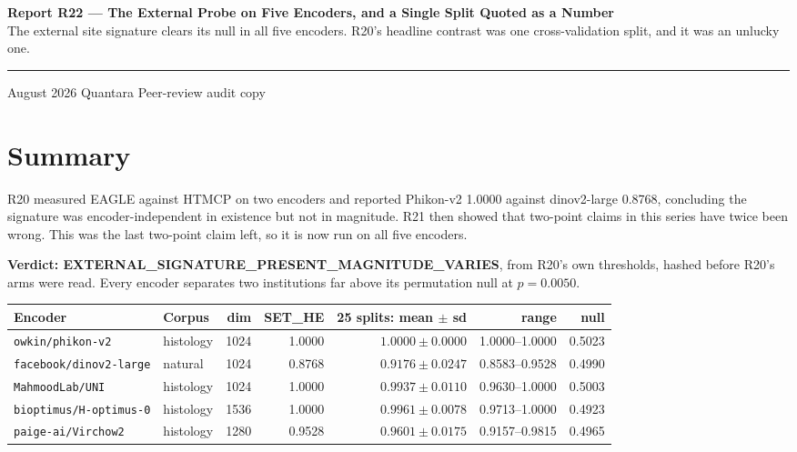 \documentclass[11pt,a4paper]{article}
\begin{document}
\thispagestyle{empty}
\noindent
{\large\bfseries\color{qnavy} Report R22 --- The External Probe on Five Encoders, and a Single
Split Quoted as a Number}\\[2pt]
{\color{qgrey}The external site signature clears its null in all five encoders. R20's headline
contrast was one cross-validation split, and it was an unlucky one.}\\[6pt]
{\color{qgrey}\rule{\textwidth}{0.4pt}}

\medskip
{} August 2026 \quad\textbullet\quad Quantara \quad\textbullet\quad
{\color{qgrey}Peer-review audit copy}

\section*{Summary}

R20 measured EAGLE against HTMCP on two encoders and reported Phikon-v2 1.0000 against
dinov2-large 0.8768, concluding the signature was encoder-independent in existence but not in
magnitude. R21 then showed that two-point claims in this series have twice been wrong. This was the
last two-point claim left, so it is now run on all five encoders.

\textbf{Verdict: EXTERNAL\_SIGNATURE\_PRESENT\_MAGNITUDE\_VARIES}, from R20's own thresholds,
hashed before R20's arms were read. Every encoder separates two institutions far above its
permutation null at $p = 0.0050$.

\begin{center}
\small
\begin{tabular}{@{}llrrrrr@{}}
\toprule
\textbf{Encoder} & \textbf{Corpus} & \textbf{dim} & \textbf{SET\_HE} &
\textbf{25 splits: mean $\pm$ sd} & \textbf{range} & \textbf{null} \\
\midrule
\texttt{owkin/phikon-v2} & histology & 1024 & 1.0000 & $1.0000 \pm 0.0000$ & 1.0000--1.0000 & 0.5023 \\
\texttt{facebook/dinov2-large} & natural & 1024 & 0.8768 & $0.9176 \pm 0.0247$ & 0.8583--0.9528 & 0.4990 \\
\texttt{MahmoodLab/UNI} & histology & 1024 & 1.0000 & $0.9937 \pm 0.0110$ & 0.9630--1.0000 & 0.5003 \\
\texttt{bioptimus/H-optimus-0} & histology & 1536 & 1.0000 & $0.9961 \pm 0.0078$ & 0.9713--1.0000 & 0.4923 \\
\texttt{paige-ai/Virchow2} & histology & 1280 & 0.9528 & $0.9601 \pm 0.0175$ & 0.9157--0.9815 & 0.4965 \\
\bottomrule
\end{tabular}
\end{center}
\end{document}
